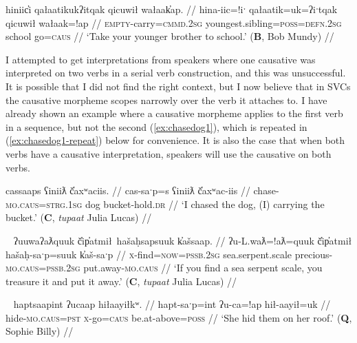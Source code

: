 \ex \label{ex:takebrothertoschool}
\begingl
\glpreamble hiniic̓i qałaatikukʔitqak qicuwił wałaak̓ap. //
\gla hina-iic=!iˑ qałaatik=uk=ʔiˑtqak qicuwił wałaak=!ap //
\glb \textsc{empty}-carry=\textsc{cmmd.2sg} youngest.sibling=\textsc{poss}=\textsc{defn.2sg} school go=\textsc{caus} //
\glft `Take your younger brother to school.' (\textbf{B}, Bob Mundy) //
\endgl
\xe

I attempted to get interpretations from speakers where one causative was interpreted on two verbs in a serial verb construction, and this was unsuccessful. It is possible that I did not find the right context, but I now believe that in SVCs the causative morpheme scopes narrowly over the verb it attaches to. I have already shown an example where a causative morpheme applies to the first verb in a sequence, but not the second (\ref{ex:chasedog1}), which is repeated in (\ref{ex:chasedog1-repeat}) below for convenience. It is also the case that when both verbs have a causative interpretation, speakers will use the causative on both verbs.

\ex \label{ex:chasedog1-repeat}
\begingl
\glpreamble cassaaps ʕiniiƛ č̓axʷaciis. //
\gla cas-saˑp=s ʕiniiƛ č̓axʷac-iis //
\glb chase-\textsc{mo.caus}=\textsc{strg.1sg} dog bucket-hold.\textsc{dr} //
\glft `I chased the dog, (I) carrying the bucket.' (\textbf{C}, \textit{tupaat} Julia Lucas) //
\endgl
\xe

\ex~ \label{ex:makepreciousputaway}
\begingl
\glpreamble ʔuuwaʔaƛquuk č̓ip̓atmił\footnotemark\ hašaḥsapsuuk k̓ašsaap. //
\gla ʔu-L.waƛ=!aƛ=quuk č̓ip̓atmił hašaḥ-saˑp=suuk k̓aš-saˑp //
\glb \textsc{x}-find=\textsc{now}=\textsc{pssb.2sg} sea.serpent.scale precious-\textsc{mo.caus}=\textsc{pssb.2sg} put.away-\textsc{mo.caus} //
\glft `If you find a sea serpent scale, you treasure it and put it away.' (\textbf{C}, \textit{tupaat} Julia Lucas) //
\endgl
\xe


\ex~ \label{ex:hideonroof}
\begingl
\glpreamble haptsaapint ʔucaap hiłaayiłkʷ. //
\gla hapt-saˑp=int ʔu-ca=!ap hił-aayił=uk //
\glb hide-\textsc{mo.caus}=\textsc{pst} \textsc{x}-go=\textsc{caus} be.at-above=\textsc{poss} //
\glft `She hid them on her roof.' (\textbf{Q}, Sophie Billy) //
\endgl
\xe


